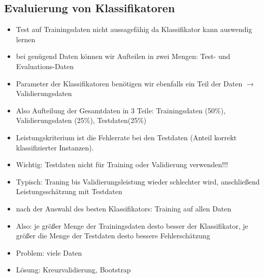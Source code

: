 \documentclass{article} %
\begin{document}
	\subsection{Evaluierung von Klassifikatoren}
	\begin{itemize}
		\item Test auf Trainingsdaten nicht aussagefähig da Klassifikator kann auswendig lernen
		\item bei genügend Daten können wir Aufteilen in zwei Mengen: Test- und Evaluations-Daten
		\item Parameter der Klassifikatoren benötigen wir ebenfalls ein Teil der Daten $\rightarrow$ Validierungsdaten
		\item Also Aufteilung der Gesamtdaten in 3 Teile: Trainingsdaten (50\%), Validierungsdaten (25\%), Testdaten(25\%)
		\item Leistungskriterium ist die Fehlerrate bei den Testdaten (Anteil korrekt klassifizierter Instanzen).
		\item Wichtig: Testdaten nicht für Training oder Validierung verwenden!!!
		\item Typisch: Traning bis Validierungsleistung wieder schlechter wird, anschließend Leistungsschätzung mit Testdaten
		\item nach der Auswahl des besten Klassifikators: Training auf allen Daten
		\item Also: je größer Menge der Trainingsdaten desto besser der Klassifikator, je größer die Menge der Testdaten desto bessere Fehlerschätzung
		\item Problem: viele Daten
		\item Lösung: Kreuzvalidierung, Bootstrap
	\end{itemize}
\end{document}
